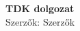 \begin{titlepage}

\center
\vspace*{7.5cm}
{\huge \bfseries TDK dolgozat}\\[0.5cm]

{\LARGE Szerzők: {Szerzők}}

\vfill

\end{titlepage}
